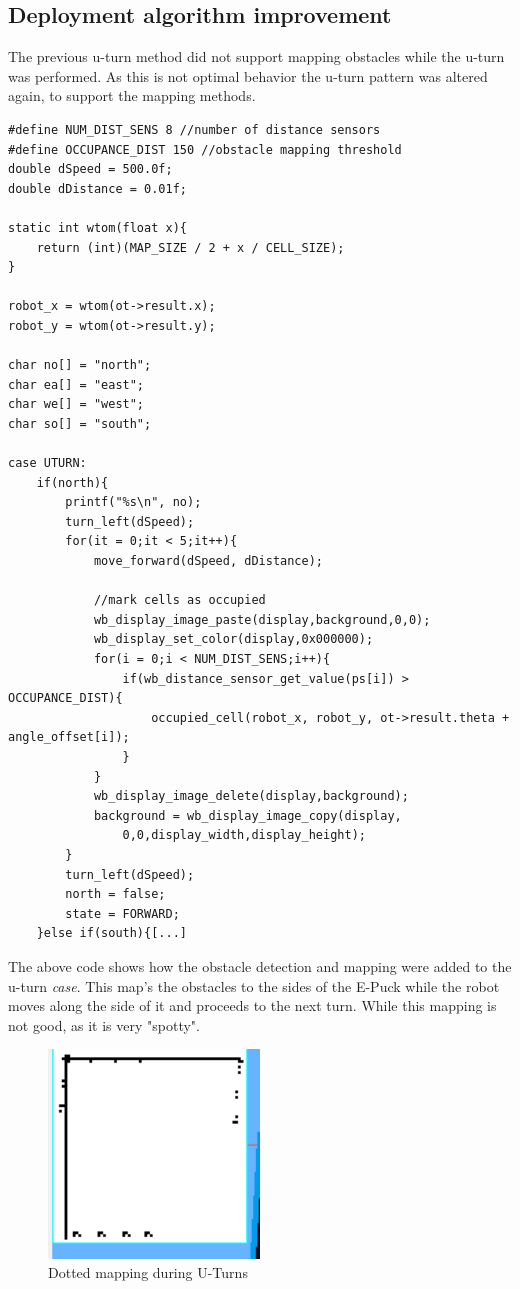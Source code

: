 \begin{flushleft}
\subsection{Deployment algorithm improvement}
\label{deployment_improvement}
The previous u-turn method did not support mapping obstacles while the u-turn was performed. As this is not optimal behavior the u-turn pattern was altered again, to support the mapping methods. 

\begin{lstlisting}[caption={U-turn improved with obstacle detection and mapping}]
#define NUM_DIST_SENS 8 //number of distance sensors 
#define OCCUPANCE_DIST 150 //obstacle mapping threshold
double dSpeed = 500.0f;
double dDistance = 0.01f;

static int wtom(float x){
	return (int)(MAP_SIZE / 2 + x / CELL_SIZE);
}

robot_x = wtom(ot->result.x);
robot_y = wtom(ot->result.y);

char no[] = "north";
char ea[] = "east";
char we[] = "west";
char so[] = "south";

case UTURN:
	if(north){
		printf("%s\n", no);
		turn_left(dSpeed);
		for(it = 0;it < 5;it++){
			move_forward(dSpeed, dDistance);
			
			//mark cells as occupied
			wb_display_image_paste(display,background,0,0);
			wb_display_set_color(display,0x000000);
			for(i = 0;i < NUM_DIST_SENS;i++){
				if(wb_distance_sensor_get_value(ps[i]) > OCCUPANCE_DIST){
					occupied_cell(robot_x, robot_y, ot->result.theta + angle_offset[i]);
				}
			}
			wb_display_image_delete(display,background);
			background = wb_display_image_copy(display,
				0,0,display_width,display_height); 
		}
		turn_left(dSpeed);
		north = false;
		state = FORWARD;
	}else if(south){[...]
\end{lstlisting}

The above code shows how the obstacle detection and mapping were added to the u-turn \textit{case}. 
This map's the obstacles to the sides of the E-Puck while the robot moves along the side of it and proceeds to the next turn. While this mapping is not good, as it is very "spotty".

\begin{figure}[h]
\centering
\includegraphics[width = 0.5\textwidth]{../../figures/map_results/dotted_uturn_mapping.png} 
\caption{Dotted mapping during U-Turns}
\label{dotted_uturn}
\end{figure}


\end{flushleft}
